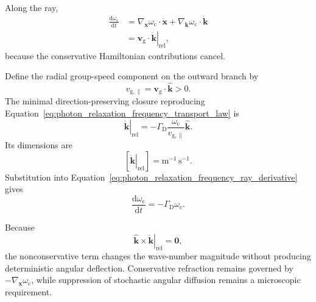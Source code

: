 Along the ray,
\begin{align}
    \frac{
        \mathrm d\omega_{\mathrm c}
    }{
        \mathrm dt
    }
    &=
    \nabla_{\mathbf x}\omega_{\mathrm c}
    \cdot
    \dot{\mathbf x}
    +
    \nabla_{\mathbf k}\omega_{\mathrm c}
    \cdot
    \dot{\mathbf k}
    \nonumber\\
    &=
    \mathbf v_{\mathrm g}
    \cdot
    \left.
        \dot{\mathbf k}
    \right|_{\mathrm{rel}},
    \label{eq:photon_relaxation_frequency_ray_derivative}
\end{align}
because the conservative Hamiltonian contributions cancel.

Define the radial group-speed component on the outward branch by
\begin{equation}
    v_{\mathrm{g},\parallel}
    =
    \mathbf v_{\mathrm g}
    \cdot
    \widehat{\mathbf k}
    >
    0.
    \label{eq:photon_relaxation_positive_radial_group_speed}
\end{equation}
The minimal direction-preserving closure reproducing
Equation~\eqref{eq:photon_relaxation_frequency_transport_law} is
\begin{equation}
    \boxed{
    \left.
        \dot{\mathbf k}
    \right|_{\mathrm{rel}}
    =
    -
    \Gamma_{\mathrm D}
    \frac{
        \omega_{\mathrm c}
    }{
        v_{\mathrm{g},\parallel}
    }
    \widehat{\mathbf k}.
    }
    \label{eq:photon_relaxation_longitudinal_k_drag}
\end{equation}
Its dimensions are
\begin{equation}
    \left[
        \left.
            \dot{\mathbf k}
        \right|_{\mathrm{rel}}
    \right]
    =
    \mathrm{m^{-1}\,s^{-1}}.
    \label{eq:photon_relaxation_wavevector_drag_dimensions}
\end{equation}
Substitution into
Equation~\eqref{eq:photon_relaxation_frequency_ray_derivative} gives
\begin{equation}
    \frac{
        \mathrm d\omega_{\mathrm c}
    }{
        \mathrm dt
    }
    =
    -\Gamma_{\mathrm D}\omega_{\mathrm c}.
    \label{eq:photon_relaxation_k_drag_frequency_result}
\end{equation}

Because
\begin{equation}
    \widehat{\mathbf k}
    \times
    \left.
        \dot{\mathbf k}
    \right|_{\mathrm{rel}}
    =
    \mathbf 0,
    \label{eq:photon_relaxation_no_dissipative_deflection}
\end{equation}
the nonconservative term changes the wave-number magnitude without producing
deterministic angular deflection. Conservative refraction remains governed by
\(-\nabla_{\mathbf x}\omega_{\mathrm c}\), while suppression of stochastic
angular diffusion remains a microscopic requirement.

